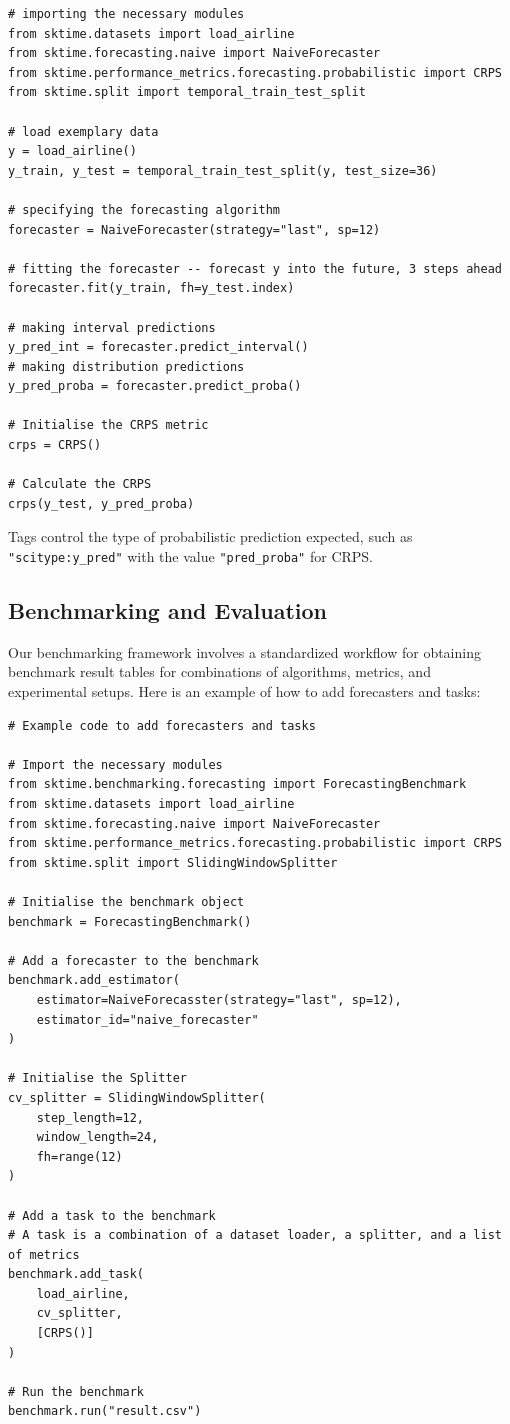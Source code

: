 \begin{verbatim}
# importing the necessary modules
from sktime.datasets import load_airline
from sktime.forecasting.naive import NaiveForecaster
from sktime.performance_metrics.forecasting.probabilistic import CRPS
from sktime.split import temporal_train_test_split

# load exemplary data
y = load_airline()
y_train, y_test = temporal_train_test_split(y, test_size=36)

# specifying the forecasting algorithm
forecaster = NaiveForecaster(strategy="last", sp=12)

# fitting the forecaster -- forecast y into the future, 3 steps ahead
forecaster.fit(y_train, fh=y_test.index)

# making interval predictions
y_pred_int = forecaster.predict_interval()
# making distribution predictions
y_pred_proba = forecaster.predict_proba()

# Initialise the CRPS metric
crps = CRPS()

# Calculate the CRPS
crps(y_test, y_pred_proba)
\end{verbatim}

Tags control the type of probabilistic prediction expected, such as \texttt{"scitype:y\_pred"} with the value \texttt{"pred\_proba"} for CRPS.

\subsection{Benchmarking and Evaluation}
Our benchmarking framework involves a standardized workflow for obtaining benchmark result tables for combinations of algorithms, metrics, and experimental setups. Here is an example of how to add forecasters and tasks:

\begin{verbatim}
# Example code to add forecasters and tasks

# Import the necessary modules
from sktime.benchmarking.forecasting import ForecastingBenchmark
from sktime.datasets import load_airline
from sktime.forecasting.naive import NaiveForecaster
from sktime.performance_metrics.forecasting.probabilistic import CRPS
from sktime.split import SlidingWindowSplitter

# Initialise the benchmark object
benchmark = ForecastingBenchmark()

# Add a forecaster to the benchmark
benchmark.add_estimator(
    estimator=NaiveForecasster(strategy="last", sp=12),
    estimator_id="naive_forecaster"
)     

# Initialise the Splitter
cv_splitter = SlidingWindowSplitter(
    step_length=12,
    window_length=24,
    fh=range(12)
)

# Add a task to the benchmark
# A task is a combination of a dataset loader, a splitter, and a list of metrics
benchmark.add_task(
    load_airline,
    cv_splitter,
    [CRPS()]
)

# Run the benchmark
benchmark.run("result.csv")
\end{verbatim}

